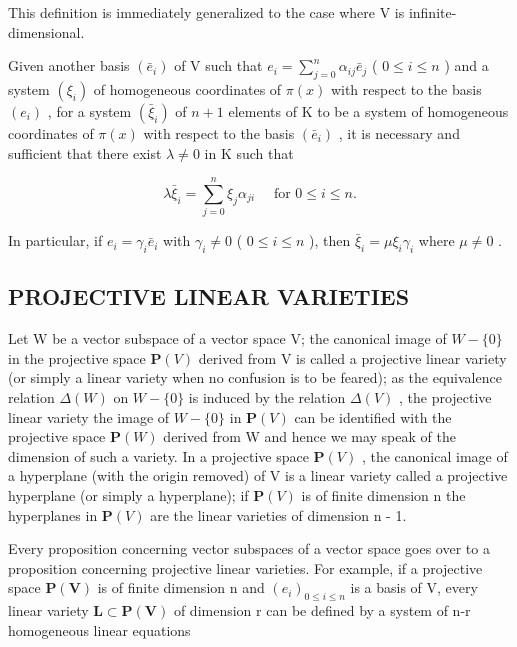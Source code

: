 This definition is immediately generalized to the case where V is infinite-dimensional.

Given another basis \((\bar{e}_i)\) of V such that \(e_i = \sum_{j=0}^{n} \alpha_{ij} \bar{e}_j\) ( \(0 \leqslant i \leqslant n\) ) and a system \((\xi_i)\) of homogeneous coordinates of \(\pi(x)\) with respect to the basis \((e_i)\) , for a system \((\bar{\xi}_i)\) of \(n+1\) elements of K to be a system of homogeneous coordinates of \(\pi(x)\) with respect to the basis \((\bar{e}_i)\) , it is necessary and sufficient that there exist \(\lambda \neq 0\) in K such that

\[
\lambda \bar {\xi} _ {i} = \sum_ {j = 0} ^ {n} \xi_ {j} \alpha_ {j i} \quad \text { for } 0 \leqslant i \leqslant n.
\]

In particular, if \(e_i = \gamma_i \bar{e}_i\) with \(\gamma_i \neq 0\) ( \(0 \leqslant i \leqslant n\) ), then \(\bar{\xi}_i = \mu \xi_i \gamma_i\) where \(\mu \neq 0\) .

\subsection{PROJECTIVE LINEAR VARIETIES}

Let W be a vector subspace of a vector space V; the canonical image of \(W - \{0\}\) in the projective space \(\mathbf{P}(V)\) derived from V is called a projective linear variety (or simply a linear variety when no confusion is to be feared); as the equivalence relation \(\Delta(W)\) on \(W - \{0\}\) is induced by the relation \(\Delta(V)\) , the projective linear variety the image of \(W - \{0\}\) in \(\mathbf{P}(V)\) can be identified with the projective space \(\mathbf{P}(W)\) derived from W and hence we may speak of the dimension of such a variety. In a projective space \(\mathbf{P}(V)\) , the canonical image of a hyperplane (with the origin removed) of V is a linear variety called a projective hyperplane (or simply a hyperplane); if \(\mathbf{P}(V)\) is of finite dimension n the hyperplanes in \(\mathbf{P}(V)\) are the linear varieties of dimension n - 1.

Every proposition concerning vector subspaces of a vector space goes over to a proposition concerning projective linear varieties. For example, if a projective space \(\mathbf{P}(\mathbf{V})\) is of finite dimension n and \((e_{i})_{0\leqslant i\leqslant n}\) is a basis of V, every linear variety \(\mathbf{L}\subset\mathbf{P}(\mathbf{V})\) of dimension r can be defined by a system of n-r homogeneous linear equations

